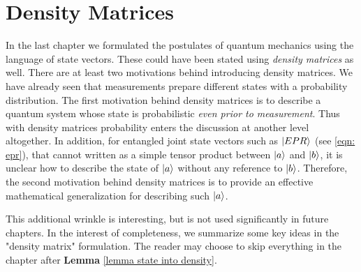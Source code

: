 
\chapter{Density Matrices} %

\label{Chapter4-density matrix} %


In the last chapter we formulated the postulates of quantum mechanics using the language of state vectors. These could have been stated using \textit{density matrices} as well. 
{\color{green}
There are at least two motivations behind introducing density matrices. We have already seen that measurements prepare different states with a probability distribution. The first motivation behind density matrices is to describe a quantum system whose state is probabilistic {\emph{even prior to measurement}}.  Thus with density matrices probability enters the discussion at another level altogether.
In addition, for entangled joint state vectors such as $\ket{EPR}$ (see \eqref{eqn: epr}), that cannot written as a simple tensor product between $\ket{a}$ and $\ket{b}$, it is unclear how to describe the state of $\ket{a}$ without any reference to $\ket{b}$. Therefore, the second motivation behind density matrices is to provide an effective mathematical generalization for describing such $\ket{a}$. 
}

This additional wrinkle is interesting, but is not used significantly in future chapters.  In the interest of completeness, we summarize some key ideas in the "density matrix" formulation.  The reader may choose to skip everything in the chapter after {\bf{Lemma}} \ref{lemma state into density}.

